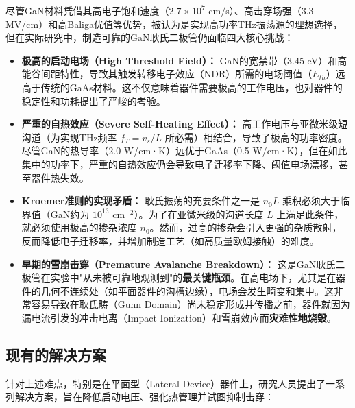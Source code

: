 \documentclass[12pt,a4paper]{article}
\begin{document}
尽管GaN材料凭借其高电子饱和速度（$2.7 \times 10^7$ cm/s）、高击穿场强（3.3 MV/cm）和高Baliga优值等优势\cite{li2018gan}，被认为是实现高功率THz振荡源的理想选择，但在实际研究中，制造可靠的GaN耿氏二极管仍面临四大核心挑战：

\begin{itemize}
    \item \textbf{极高的启动电场（High Threshold Field）：} GaN的宽禁带（3.45 eV）和高能谷间距特性，导致其触发转移电子效应（NDR）所需的电场阈值（$E_{th}$）远高于传统的GaAs材料。这不仅意味着器件需要极高的工作电压，也对器件的稳定性和功耗提出了严峻的考验。

    \item \textbf{严重的自热效应（Severe Self-Heating Effect）：} 高工作电压与亚微米级短沟道（为实现THz频率 $f_T = v_s / L$ 所必需）相结合，导致了极高的功率密度。尽管GaN的热导率（2.0 W/cm·K）远优于GaAs（0.5 W/cm·K）\cite{li2018gan}，但在如此集中的功率下，严重的自热效应仍会导致电子迁移率下降、阈值电场漂移，甚至器件热失效。

    \item \textbf{Kroemer准则的实现矛盾：} 耿氏振荡的充要条件之一是 $n_0L$ 乘积必须大于临界值（GaN约为 $10^{13} \text{ cm}^{-2}$）。为了在亚微米级的沟道长度 $L$ 上满足此条件，就必须使用极高的掺杂浓度 $n_0$。然而，过高的掺杂会引入更强的杂质散射，反而降低电子迁移率，并增加制造工艺（如高质量欧姆接触）的难度。

    \item \textbf{早期的雪崩击穿（Premature Avalanche Breakdown）：} 这是GaN耿氏二极管在实验中"从未被可靠地观测到"的\textbf{最关键瓶颈}。在高电场下，尤其是在器件的几何不连续处（如平面器件的沟槽边缘），电场会发生畸变和集中。这非常容易导致在耿氏畴（Gunn Domain）尚未稳定形成并传播之前，器件就因为漏电流引发的冲击电离（Impact Ionization）和雪崩效应而\textbf{灾难性地烧毁}。
\end{itemize}

\subsection{现有的解决方案}

针对上述难点，特别是在平面型（Lateral Device）器件上，研究人员提出了一系列解决方案，旨在降低启动电压、强化热管理并试图抑制击穿：
\end{document}
